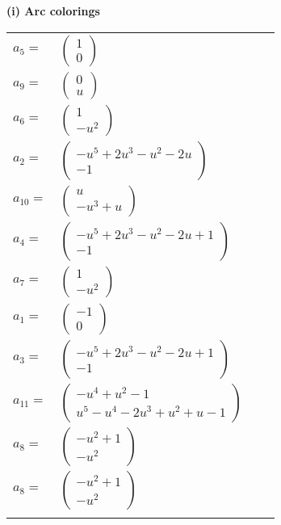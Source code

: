 \documentclass[1p]{elsarticle_modified}
\theoremstyle{definition}
\begin{document}
\flushleft \textbf{(i) Arc colorings}\\
\begin{tabular}{m{7pt} m{180pt} m{7pt} m{180pt} }
\flushright $a_{5}=$&$\begin{pmatrix}1\\0\end{pmatrix}$ \\
\flushright $a_{9}=$&$\begin{pmatrix}0\\u\end{pmatrix}$ \\
\flushright $a_{6}=$&$\begin{pmatrix}1\\- u^2\end{pmatrix}$ \\
\flushright $a_{2}=$&$\begin{pmatrix}- u^5+2 u^3- u^2-2 u\\-1\end{pmatrix}$ \\
\flushright $a_{10}=$&$\begin{pmatrix}u\\- u^3+u\end{pmatrix}$ \\
\flushright $a_{4}=$&$\begin{pmatrix}- u^5+2 u^3- u^2-2 u+1\\-1\end{pmatrix}$ \\
\flushright $a_{7}=$&$\begin{pmatrix}1\\- u^2\end{pmatrix}$ \\
\flushright $a_{1}=$&$\begin{pmatrix}-1\\0\end{pmatrix}$ \\
\flushright $a_{3}=$&$\begin{pmatrix}- u^5+2 u^3- u^2-2 u+1\\-1\end{pmatrix}$ \\
\flushright $a_{11}=$&$\begin{pmatrix}- u^4+u^2-1\\u^5- u^4-2 u^3+u^2+u-1\end{pmatrix}$ \\
\flushright $a_{8}=$&$\begin{pmatrix}- u^2+1\\- u^2\end{pmatrix}$\\ \flushright $a_{8}=$&$\begin{pmatrix}- u^2+1\\- u^2\end{pmatrix}$\\&\end{tabular}
\end{document}
